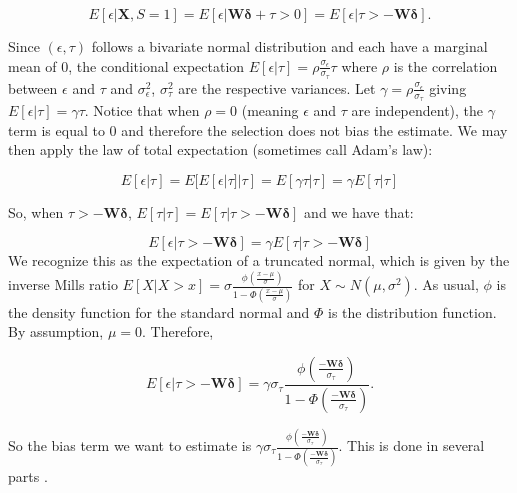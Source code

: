 \documentclass[12pt,twoside]{reedthesis}
\theoremstyle{definition}
\begin{document}
$$E[\epsilon |  \mathbf{X}, S = 1] = E[\epsilon | \mathbf{W} \boldsymbol{\delta}+ \tau > 0] = E[\epsilon |  \tau > - \mathbf{W} \boldsymbol{\delta}].$$

Since $(\epsilon, \tau)$ follows a bivariate normal distribution and each have a marginal mean of $0$, the conditional expectation $E[\epsilon | \tau] = \rho \frac{\sigma_{\epsilon}}{\sigma_{\tau}} \tau$ where $\rho$ is the correlation between $\epsilon$ and $\tau$ and $\sigma^2_{\epsilon}$, $\sigma^2_{\tau}$ are the respective variances. Let $\gamma  = \rho \frac{\sigma_{\epsilon}}{\sigma_{\tau}}$ giving $E[\epsilon | \tau] = \gamma \tau$. Notice that when $\rho = 0$ (meaning $\epsilon$ and $\tau$ are independent), the $\gamma$ term is equal to $0$ and therefore the selection does not bias the estimate.  We may then apply the law of total expectation (sometimes call Adam's law):

$$E[\epsilon | \tau] = E[E[\epsilon | \tau] | \tau] = E[\gamma \tau | \tau] = \gamma E[\tau | \tau]$$	

So, when $\tau > - \mathbf{W} \boldsymbol{\delta}$, $E[\tau | \tau] = E[\tau | \tau > - \mathbf{W} \boldsymbol{\delta}]$ and we have that:

$$E[\epsilon | \tau >  - \mathbf{W} \boldsymbol{\delta}]  = \gamma E[ \tau | \tau >   - \mathbf{W} \boldsymbol{\delta}]$$																																																												
We recognize this as the expectation of a truncated normal, which is given by the inverse Mills ratio $E[X | X > x] = \sigma \frac{\phi(\frac{x- \mu}{\sigma})}{1 - \Phi(\frac{x - \mu}{\sigma})}$ for $X \sim N(\mu, \sigma^2)$. As usual, $\phi$ is the density function for the standard normal and $\Phi$ is the distribution function. By assumption, $\mu = 0$. Therefore,						

$$E[\epsilon | \tau > -\mathbf{W} \boldsymbol{\delta}] = \gamma \sigma_{\tau}\frac{\phi(\frac{-\mathbf{W} \boldsymbol{\delta}}{\sigma_\tau})}{1 - \Phi(\frac{-\mathbf{W} \boldsymbol{\delta}}{\sigma_\tau})}.$$				

So the bias term  we want to estimate is $\gamma\sigma_{\tau}\frac{\phi(\frac{-\mathbf{W} \boldsymbol{\delta}}{\sigma_\tau})}{1 - \Phi(\frac{-\mathbf{W} \boldsymbol{\delta}}{\sigma_\tau})}$. This is done in several parts \cite{Heckman_1979}.
\end{document}
